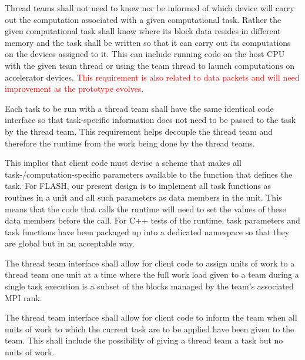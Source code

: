 \documentclass{article}
\begin{document}
\begin{req}
Thread teams shall not need to know nor be informed of which device will carry
out the computation associated with a given computational task.  Rather the
given computational task shall know where its block data resides in different
memory and the task shall be written so that it can carry out its computations
on the devices assigned to it.  This can include running code on the host CPU
with the given team thread or using the team thread to launch computations on
accelerator devices.  \textcolor{red}{This requirement is also related to data
packets and will need improvement as the prototype evolves.}
\end{req}

\begin{req}
Each task to be run with a thread team shall have the same identical code
interface so that task-specific information does not need to be passed to the
task by the thread team.  This requirement helps decouple the thread team and
therefore the runtime from the work being done by the thread teams.
\end{req}

This implies that client code must devise a scheme that makes all
task-/computation-specific parameters available to the function that defines the
task.  For FLASH, our present design is to implement all task functions as
routines in a unit and all such parameters as data members in the unit.  This
means that the code that calls the runtime will need to set the values of these
data members before the call.  For C++ tests of the runtime, task parameters
and task functions have been packaged up into a dedicated namespace so that they
are global but in an acceptable way.

\begin{req}
The thread team interface shall allow for client code to assign units of
work to a thread team one unit at a time where the full work load given to a
team during a single task execution is a subset of the blocks managed by the
team's associated MPI rank.
\end{req}

\begin{req}
The thread team interface shall allow for client code to inform the team when
all units of work to which the current task are to be applied have been given to
the team.  This shall include the possibility of giving a thread team a task but
no units of work.
\end{req}
\end{document}

